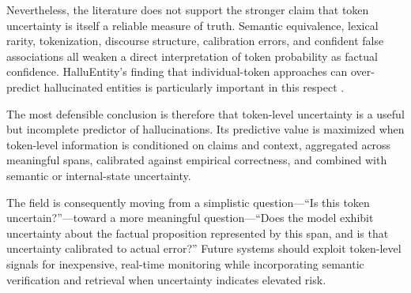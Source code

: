 \documentclass[11pt]{article}
\begin{document}
Nevertheless, the literature does not support the stronger claim that token uncertainty is itself a reliable measure of truth. Semantic equivalence, lexical rarity, tokenization, discourse structure, calibration errors, and confident false associations all weaken a direct interpretation of token probability as factual confidence. HalluEntity's finding that individual-token approaches can over-predict hallucinated entities is particularly important in this respect \cite{yeh2025}.

The most defensible conclusion is therefore that token-level uncertainty is a useful but incomplete predictor of hallucinations. Its predictive value is maximized when token-level information is conditioned on claims and context, aggregated across meaningful spans, calibrated against empirical correctness, and combined with semantic or internal-state uncertainty.

The field is consequently moving from a simplistic question---``Is this token uncertain?''---toward a more meaningful question---``Does the model exhibit uncertainty about the factual proposition represented by this span, and is that uncertainty calibrated to actual error?'' Future systems should exploit token-level signals for inexpensive, real-time monitoring while incorporating semantic verification and retrieval when uncertainty indicates elevated risk.

\end{document}
